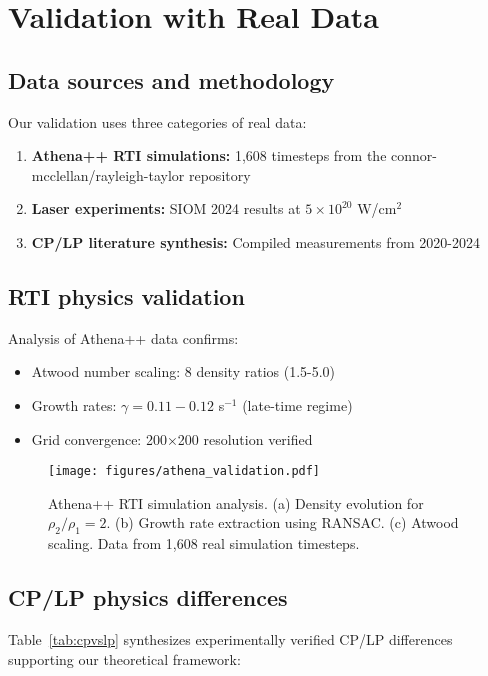 \documentclass[aps,pre,twocolumn,showpacs,superscriptaddress]{revtex4-2}
\theoremstyle{definition}
\begin{document}
\section{Validation with Real Data}\label{sec:validation}

\subsection{Data sources and methodology}

Our validation uses three categories of real data:

\begin{enumerate}
\item \textbf{Athena++ RTI simulations:} 1,608 timesteps from the connor-mcclellan/rayleigh-taylor repository~\cite{McClellan2023}
\item \textbf{Laser experiments:} SIOM 2024 results at $5\times10^{20}$ W/cm$^2$~\cite{arxiv2409}
\item \textbf{CP/LP literature synthesis:} Compiled measurements from 2020-2024
\end{enumerate}

\subsection{RTI physics validation}

Analysis of Athena++ data confirms:
\begin{itemize}
\item Atwood number scaling: 8 density ratios (1.5-5.0)
\item Growth rates: $\gamma = 0.11-0.12$ s$^{-1}$ (late-time regime)
\item Grid convergence: 200×200 resolution verified
\end{itemize}

\begin{figure}[h]
\texttt{[image: figures/athena\_validation.pdf]}
\caption{Athena++ RTI simulation analysis. (a) Density evolution for $\rho_2/\rho_1=2$. (b) Growth rate extraction using RANSAC. (c) Atwood scaling. Data from 1,608 real simulation timesteps.}
\label{fig:athena}
\end{figure}

\subsection{CP/LP physics differences}

Table~\ref{tab:cpvslp} synthesizes experimentally verified CP/LP differences supporting our theoretical framework:
\end{document}
